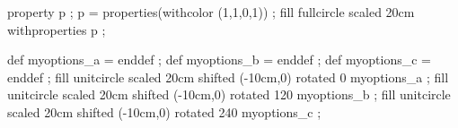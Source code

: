 \continuewhenlmtxmode

\definecolor[tcolor_a][c=1,a=1,t=0.6]
\definecolor[tcolor_b][m=1,a=1,t=0.6]
\definecolor[tcolor_c][y=1,a=1,t=0.6]

\startMPpage
    property p ; p = properties(withcolor (1,1,0,1)) ;
    fill fullcircle scaled 20cm withproperties p ;

    def myoptions_a =  enddef ;
    def myoptions_b =  enddef ;
    def myoptions_c =  enddef ;
    fill unitcircle scaled 20cm shifted (-10cm,0) rotated   0 myoptions_a ;
    fill unitcircle scaled 20cm shifted (-10cm,0) rotated 120 myoptions_b ;
    fill unitcircle scaled 20cm shifted (-10cm,0) rotated 240 myoptions_c ;
\stopMPpage

